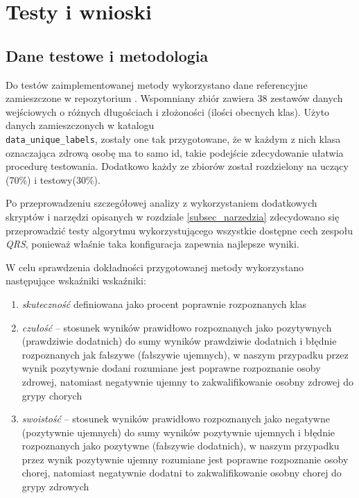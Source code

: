 \section{Testy i wnioski}
\label{sec_testy}

\subsection{Dane testowe i metodologia}
Do testów zaimplementowanej metody wykorzystano dane referencyjne zamieszczone w repozytorium \cite{ref_data_repo}. Wspomniany zbiór zawiera 38 zestawów danych wejściowych o różnych długościach i złożoności (ilości obecnych klas). Użyto danych zamieszczonych w katalogu \\ \texttt{data\_unique\_labels}, zostały one tak przygotowane, że w każdym z nich klasa oznaczająca zdrową osobę ma to samo id, takie podejście zdecydowanie ułatwia procedurę testowania. Dodatkowo każdy ze zbiorów został rozdzielony na uczący (70\%) i testowy(30\%). 

Po przeprowadzeniu szczegółowej analizy z wykorzystaniem dodatkowych skryptów i narzędzi opisanych w rozdziale \ref{subsec_narzedzia} zdecydowano się przeprowadzić testy algorytmu wykorzystującego wszystkie dostępne cech zespołu \textit{QRS}, ponieważ właśnie taka konfiguracja zapewnia najlepsze wyniki.

W celu sprawdzenia dokładności przygotowanej metody wykorzystano następujące wskaźniki wskaźniki:

\begin{enumerate}
\item \textit{skuteczność} definiowana jako procent poprawnie rozpoznanych klas
\item \textit{czułość} -- stosunek wyników prawidłowo rozpoznanych jako pozytywnych (prawdziwie dodatnich) do sumy wyników prawdziwie dodatnich i błędnie rozpoznanych jak fałszywe (fałszywie ujemnych), w naszym przypadku przez wynik pozytywnie dodani rozumiane jest poprawne rozpoznanie osoby zdrowej, natomiast negatywnie ujemny to zakwalifikowanie osobny zdrowej do grypy chorych

\item \textit{swoistość} -- stosunek wyników prawidłowo rozpoznanych jako negatywne (pozytywnie ujemnych) do sumy wyników pozytywnie ujemnych i błędnie rozpoznanych jako pozytywne (fałszywie dodatnich), w naszym przypadku przez wynik pozytywnie ujemny rozumiane jest poprawne rozpoznanie osoby chorej, natomiast negatywnie dodatni to zakwalifikowanie osobny chorej do grypy zdrowych
\end{enumerate} 

